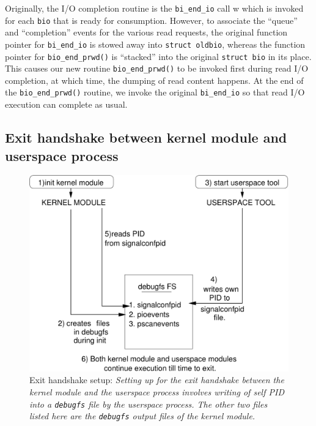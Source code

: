 Originally, the I/O completion routine is the \texttt{bi\_end\_io} call w
which is invoked for each \texttt{bio} that is ready for consumption.
However, to associate the ``queue'' and ``completion'' events for the
various read requests, the original function pointer for \texttt{bi\_end\_io}
is stowed away into \texttt{struct oldbio}, whereas the function pointer
for \texttt{bio\_end\_prwd()} is ``stacked'' into the original 
\texttt{struct bio} in its place. This causes our new routine 
\texttt{bio\_end\_prwd()} to be invoked first during read I/O completion,
at which time, the dumping of read content happens. At the end of the
\texttt{bio\_end\_prwd()} routine, we invoke the original \texttt{bi\_end\_io}
so that read I/O execution can complete as usual.

\subsection{Exit handshake between kernel module and userspace process}
\begin{figure}[t]
    \centering
    \includegraphics[scale=0.65]{tracingchap-figures/tracing-handshakesetup.pdf}
    \caption{Exit handshake setup: 
		\textit{Setting up for the exit handshake between the kernel 
		module and the userspace process involves writing of self PID
		into a \texttt{debugfs} file by the userspace process. The other
		two files listed here are the \texttt{debugfs} output files 
		of the kernel module.}}
    \label{fig:tracing-handshakesetup}
\end{figure}

